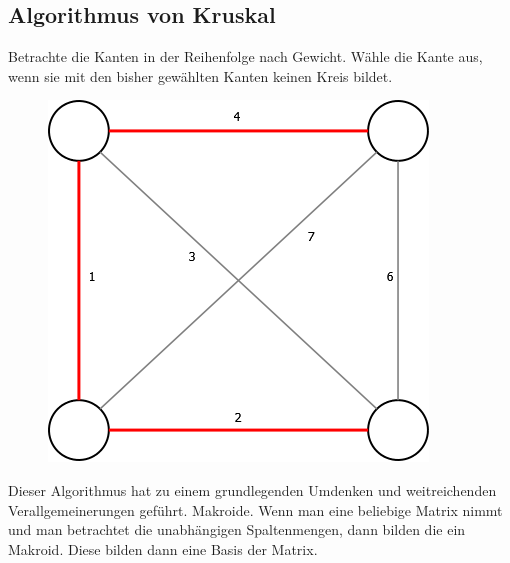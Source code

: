  \subsection{Algorithmus von Kruskal}
 Betrachte die Kanten in der Reihenfolge nach Gewicht. Wähle die Kante aus, wenn sie mit den bisher gewählten Kanten keinen Kreis bildet.\\
 \begin{figure}[h]
    \begin{center}
        \includegraphics[width=\textwidth / 2]{../GFX/vl13_10.png}
        \label{fig:vl13_1}
    \end{center}
\end{figure}
Dieser Algorithmus hat zu einem grundlegenden Umdenken und weitreichenden Verallgemeinerungen geführt. Makroide. Wenn man eine beliebige Matrix nimmt und man betrachtet die unabhängigen Spaltenmengen, dann bilden die ein Makroid. Diese bilden dann eine Basis der Matrix.\\